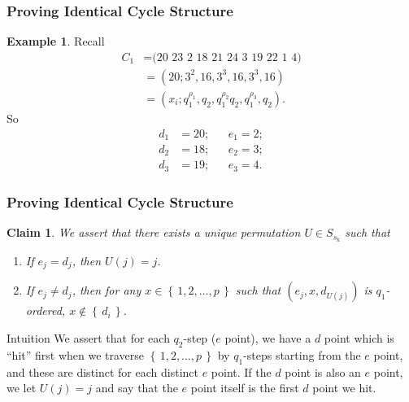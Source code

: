 \documentclass{beamer}
\theoremstyle{plain}
\newtheorem*{Claim}{Claim}
\theoremstyle{definition}
\newtheorem{Ex}[theorem]{Example}
\theoremstyle{remark}
\newcommand{\bee}{\begin{equation}\begin{aligned}}
\newcommand{\eee}{\end{aligned}\end{equation}}
\renewcommand{\'}{\hspace{0.5mm}'}		%
\renewcommand{\Set}[1]{\left\{\,#1\,\right\}}	%
\begin{document}

\begin{frame}
\frametitle{Proving Identical Cycle Structure}

	\begin{Ex}
		Recall
		\bee
			C_1 &= \text{(20 23 2 18 21 24 3 19 22 1 4)} \\
			&= (20;3^2,16,3^3,16,3^3,16) \\
			&= (x_i; q_1^{\rho_1},q_2,q_1^{\rho_2}
			q_2, q_1^{\rho_3},q_2). 
		\eee
		So
		\bee
			d_1 &= 20; && e_1 = 2; \\
			d_2 &= 18; && e_2 = 3; \\
			d_3 &= 19; && e_3 = 4. 
		\eee
	\end{Ex}
	

\end{frame}


\begin{frame}
\frametitle{Proving Identical Cycle Structure}

	\begin{Claim}
		We assert that there exists a unique permutation
		$U \in S_{s_k}$ such that 
		\begin{enumerate}
			\item If $e_j = d_j$, then $U(j) = j$. 
			\item If $e_j \neq d_j$, then
			for any $x \in \Set{1,2,\hdots, p}$
			such that $(e_j,x,d_{U(j)})$ is $q_1$-ordered,
			$x \notin \Set{d_i}$. 
		\end{enumerate}
		
		
	\end{Claim}
	\begin{block}{Intuition}
		We assert that for each $q_2$-step
		($e$ point), we have a $d$ point
		which is ``hit'' first when we traverse
		$\Set{1,2,\hdots, p}$ by $q_1$-steps 
		starting from the $e$ point, and these
		are distinct for each distinct $e$ point. 
		If the $d$ point is also an $e$ point, 
		we let $U(j) = j$ and say that the $e$ 
		point itself is the first $d$ point we hit. 
	\end{block}
	

\end{frame}

\end{document}

